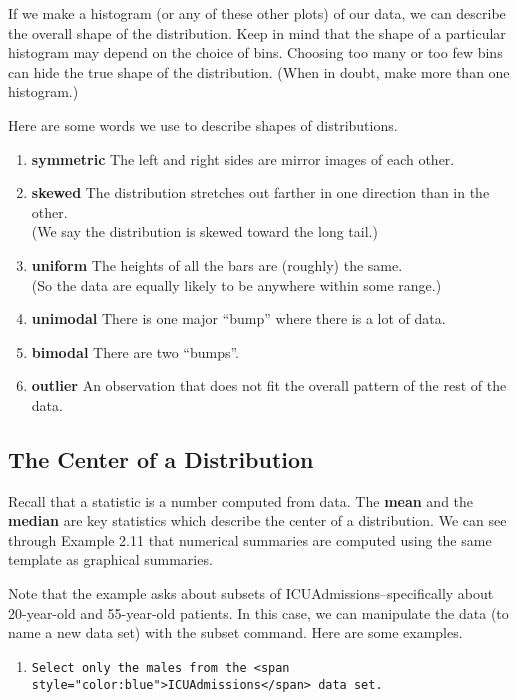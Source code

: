 \documentclass[]{book}
\providecommand{\tightlist}{%
  \setlength{\itemsep}{0pt}\setlength{\parskip}{0pt}}
\begin{document}
If we make a histogram (or any of these other plots) of our data, we can describe the overall shape of the distribution. Keep in mind that the shape of a particular histogram may depend on the choice of bins. Choosing too many or too few bins can hide the true shape of the distribution. (When in doubt, make more than one histogram.)

Here are some words we use to describe shapes of distributions.

\begin{enumerate}
\tightlist
\item
  \textbf{symmetric} The left and right sides are mirror images of each other.
\item
  \textbf{skewed} The distribution stretches out farther in one direction than in the other.\\
  (We say the distribution is skewed toward the long tail.)
\item
  \textbf{uniform} The heights of all the bars are (roughly) the same.\\
  (So the data are equally likely to be anywhere within some range.)
\item
  \textbf{unimodal} There is one major ``bump'' where there is a lot of data.
\item
  \textbf{bimodal} There are two ``bumps''.
\item
  \textbf{outlier} An observation that does not fit the overall pattern of the rest of
  the data.
\end{enumerate}

\hypertarget{the-center-of-a-distribution}{%
\subsection{The Center of a Distribution}\label{the-center-of-a-distribution}}

Recall that a statistic is a number computed from data. The \textbf{mean} and the \textbf{median} are key statistics which describe the center of a distribution. We can see through Example 2.11 that numerical summaries are computed using the same template as graphical summaries.

Note that the example asks about subsets of {ICUAdmissions}--specifically about 20-year-old and 55-year-old patients. In this case, we can manipulate the data (to name a new data set) with the subset command. Here are some examples.

\begin{enumerate}
\item
\begin{verbatim}
Select only the males from the <span style="color:blue">ICUAdmissions</span> data set.
\end{verbatim}
\end{enumerate}
\end{document}
